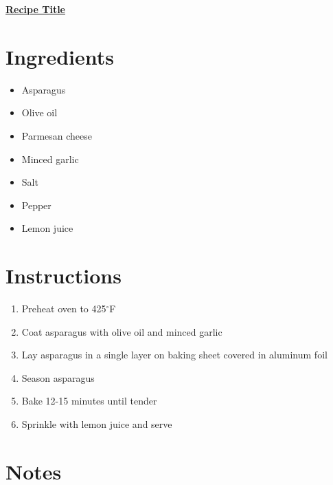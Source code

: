 \documentclass[11pt]{article}
\begin{document}
	\begin{center}\begin{huge}\underline{\textbf{Recipe Title}}\end{huge}\end{center}

	\section*{Ingredients}
	\begin{itemize}
		\item Asparagus
		\item Olive oil
		\item Parmesan cheese
		\item Minced garlic
		\item Salt
		\item Pepper
		\item Lemon juice
	\end{itemize}
	
	\section*{Instructions}
	\begin{enumerate}
		\item Preheat oven to 425$^\circ$F
		\item Coat asparagus with olive oil and minced garlic
		\item Lay asparagus in a single layer on baking sheet covered in aluminum foil
		\item Season asparagus
		\item Bake 12-15 minutes until tender
		\item Sprinkle with lemon juice and serve
	\end{enumerate}
	
	\section*{Notes}
	
\end{document}
